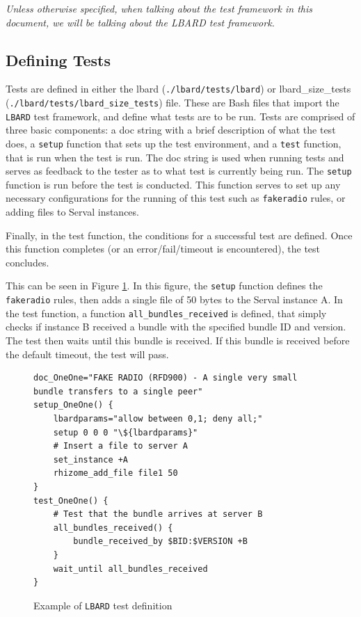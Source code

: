 \emph{Unless otherwise specified, when talking about the test framework in this document, we will be talking about the LBARD test framework.}


\subsection{Defining Tests}
Tests are defined in either the lbard (\texttt{./lbard/tests/lbard}) or lbard\_size\_tests (\texttt{./lbard/tests/lbard\_size\_tests}) file. 
These are Bash files that import the \texttt{LBARD} test framework, and define what tests are to be run.
Tests are comprised of three basic components: a doc string with a brief description of what the test does, a \texttt{setup} function that sets up the test environment, and a \texttt{test} function, that is run when the test is run.
The doc string is used when running tests and serves as feedback to the tester as to what test is currently being run.
The \texttt{setup} function is run before the test is conducted. 
This function serves to set up any necessary configurations for the running of this test such as \texttt{fakeradio} rules, or adding files to Serval instances.

Finally, in the test function, the conditions for a successful test are defined. Once this function completes (or an error/fail/timeout is encountered), the test concludes.


This can be seen in Figure \ref{fig:testDefinition}. 
In this figure, the \texttt{setup} function defines the \texttt{fakeradio} rules, then adds a single file of 50 bytes to the Serval instance A. 
In the test function, a function \texttt{all\_bundles\_received} is defined, that simply checks if instance B received a bundle with the specified bundle ID and version. 
The test then waits until this bundle is received. 
If this bundle is received before the default timeout, the test will pass.

\lstset{language=bash,
showstringspaces=false,
numbers=left,
}

\begin{figure}
    \begin{centering}

\begin{lstlisting}[breaklines, frame=single]
doc_OneOne="FAKE RADIO (RFD900) - A single very small bundle transfers to a single peer"
setup_OneOne() {
    lbardparams="allow between 0,1; deny all;"
    setup 0 0 0 "\${lbardparams}" 
    # Insert a file to server A
    set_instance +A
    rhizome_add_file file1 50
}
test_OneOne() {
    # Test that the bundle arrives at server B
    all_bundles_received() {
        bundle_received_by $BID:$VERSION +B 
    }
    wait_until all_bundles_received
} 
\end{lstlisting}
        \caption{Example of \texttt{LBARD} test definition}
        \label{fig:testDefinition}
    \end{centering}
\end{figure}

